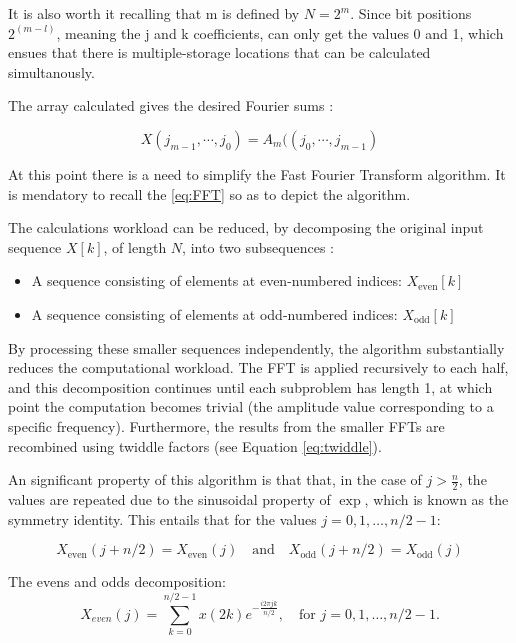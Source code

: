 {{It is also worth it recalling that m is defined by \( N = 2^m \). Since bit positions \( 2^(m-l) \), meaning the j and k coefficients, can only get the values 0 and 1, which ensues that there is multiple-storage locations that can be calculated simultanously.

The array calculated gives the desired Fourier sums \cite{CooleyTukey1965}: 

\begin{equation}
	X(j_{m-1},  \cdots, j_0) = A_{m}((j_0 ,  \cdots , j_{m-1})
\end{equation}


At this point there is a need to simplify the Fast Fourier Transform algorithm. It is mendatory to recall the \eqref{eq:FFT} so as to depict the algorithm. 

The calculations workload can be reduced, by decomposing the original input sequence \( X[k] \), of length \( N \), into two subsequences \cite{CooleyTukey1965}:

\begin{itemize}
    \item A sequence consisting of elements at even-numbered indices: \( X_{\text{even}}[k] \)
    \item A sequence consisting of elements at odd-numbered indices: \( X_{\text{odd}}[k] \)
\end{itemize}

By processing these smaller sequences independently, the algorithm substantially reduces the computational workload. The FFT is applied recursively to each half, and this decomposition continues until each subproblem has length 1, at which point the computation becomes trivial (the amplitude value corresponding to a specific frequency). Furthermore, the results from the smaller FFTs are recombined using twiddle factors (see Equation \eqref{eq:twiddle}).

An significant property of this algorithm is that that, in the case of \( j > \frac{n}{2} \), the values are repeated due to the sinusoidal property of \( \exp \), which is known as the symmetry identity. This entails that for the values \( j = 0,1,\dots,n/2-1 \):

\begin{equation}
	X_{\text{even}}(j + n/2) = X_{\text{even}}(j) \quad \text{and} \quad X_{\text{odd}}(j + n/2) = X_{\text{odd}}(j)
	\label{eq:Sym}
\end{equation}


The evens and odds decomposition:
\begin{equation}
    X_{even}(j) = \sum_{k=0}^{n/2-1} x(2k) e^{ - \frac{i 2\pi jk}{n/2} }, \quad \text{for } j = 0,1,\dots,n/2-1.
    \label{eq:Xeven}  
\end{equation}

}}
